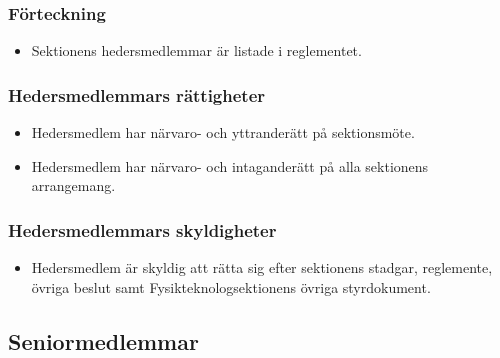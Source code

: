\documentclass[11pt,a4paper]{article}
\begin{document}
\subsubsection{Förteckning}

\begin{itemize}

  \item Sektionens hedersmedlemmar är listade i reglementet.

\end{itemize}

\subsubsection{Hedersmedlemmars rättigheter}

\begin{itemize}

   \item Hedersmedlem har närvaro- och yttranderätt på sektionsmöte.

   \item Hedersmedlem har närvaro- och intaganderätt på alla sektionens
arrangemang.

\end{itemize}

\subsubsection{Hedersmedlemmars skyldigheter}

\begin{itemize}


\item Hedersmedlem är skyldig att rätta sig efter sektionens stadgar,
   regle\-mente, övriga beslut samt  Fysikteknologsektionens övriga styrdokument.
   
\end{itemize}




\subsection{Seniormedlemmar}
\end{document}
